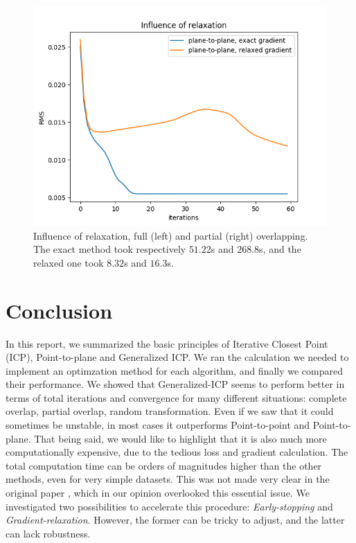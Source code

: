 \documentclass[11pt,letterpaper,leqno]{article}
\begin{document}
\begin{itemize}
\begin{figure}[ht!]
\begin{minipage}{0.5\linewidth}
        \end{minipage}\hfill
        \begin{minipage}{0.5\linewidth}
        \includegraphics[width=\linewidth]{img/comparison_relaxed.png}
        \end{minipage}
        \caption{Influence of relaxation, full (left) and partial (right) overlapping. The exact method took respectively $51.22$s and $268.8$s, and the relaxed one took $8.32$s and $16.3$s.}
        \label{fig:relaxation}
    \end{figure}
\end{itemize}

\section{Conclusion}

In this report, we summarized the basic principles of Iterative Closest Point (ICP), Point-to-plane and Generalized ICP. We ran the calculation we needed to implement an optimzation method for each algorithm, and finally we compared their performance. We showed that Generalized-ICP seems to perform better in terms of total iterations and convergence for many different situations: complete overlap, partial overlap, random transformation. Even if we saw that it could sometimes be unstable, in most cases it outperforms Point-to-point and Point-to-plane. That being said, we would like to highlight that it is also much more computationally expensive, due to the tedious loss and gradient calculation. The total computation time can be orders of magnitudes higher than the other methods, even for very simple datasets. This was not made very clear in the original paper \cite{generalized-icp}, which in our opinion overlooked this essential issue. We investigated two possibilities to accelerate this procedure: \textit{Early-stopping} and \textit{Gradient-relaxation}. However, the former can be tricky to adjust, and the latter can lack robustness.
\end{document}
